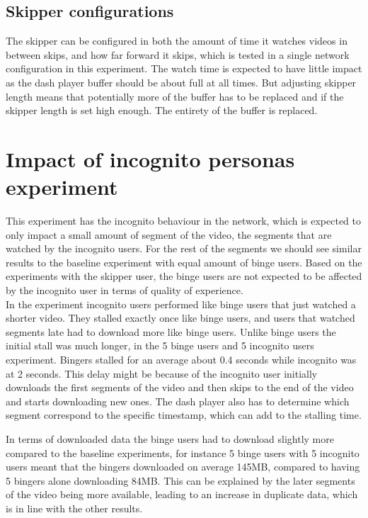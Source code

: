 \subsection{Skipper configurations}
The skipper can be configured in both the amount of time it watches videos in between skips, and how far forward it skips, which is tested in a single network configuration in this experiment. %
The watch time is expected to have little impact as the dash player buffer should be about full at all times. But adjusting skipper length means that potentially more of the buffer has to be replaced and if the skipper length is set high enough. The entirety of the buffer is replaced. %

\section{Impact of incognito personas experiment}
This experiment has the incognito behaviour in the network, which is expected to only impact a small amount of segment of the video, the segments that are watched by the incognito users. For the rest of the segments we should see similar results to the baseline experiment with equal amount of binge users. Based on the experiments with the skipper user, the binge users are not expected to be affected by the incognito user in terms of quality of experience.\\
In the experiment incognito users performed like binge users that just watched a shorter video. They stalled exactly once like binge users, and users that watched segments late had to download more like binge users. %
Unlike binge users the initial stall was much longer, in the 5 binge users and 5 incognito users experiment. Bingers stalled for an average about 0.4 seconds while incognito was at 2 seconds. This delay might be because of the incognito user initially downloads the first segments of the video and then skips to the end of the video and starts downloading new ones. The dash player also has to determine which segment correspond to the specific timestamp, which can add to the stalling time.

In terms of downloaded data the binge users had to download slightly more compared to the baseline experiments, for instance 5 binge users with 5 incognito users meant that the bingers downloaded on average 145\acs{MB}, compared to having 5 bingers alone downloading 84\acs{MB}. This can be explained by the later segments of the video being more available, leading to an increase in duplicate data, which is in line with the other results.


